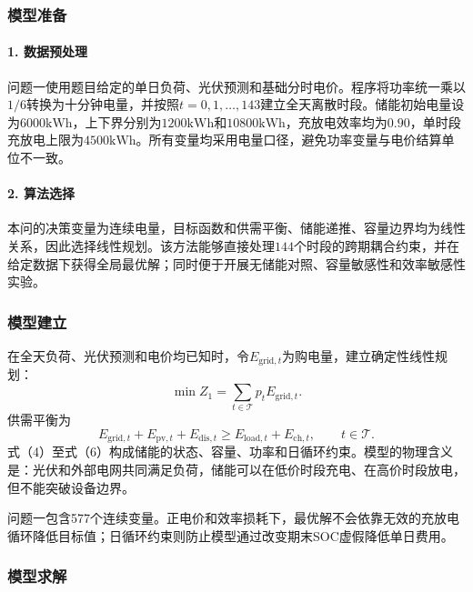 \documentclass{cumcmthesis}
\newcommand{\kwh}{\mathrm{kWh}}
\newcommand{\Tset}{\mathcal{T}}
\begin{document}
\subsubsection{模型准备}

\paragraph{1. 数据预处理}

问题一使用题目给定的单日负荷、光伏预测和基础分时电价。程序将功率统一乘以$1/6$转换为十分钟电量，并按照$ t=0,1,\ldots,143$建立全天离散时段。储能初始电量设为$6000\kwh$，上下界分别为$1200\kwh$和$10800\kwh$，充放电效率均为$0.90$，单时段充放电上限为$4500\kwh$。所有变量均采用电量口径，避免功率变量与电价结算单位不一致。

\paragraph{2. 算法选择}

本问的决策变量为连续电量，目标函数和供需平衡、储能递推、容量边界均为线性关系，因此选择线性规划。该方法能够直接处理$144$个时段的跨期耦合约束，并在给定数据下获得全局最优解；同时便于开展无储能对照、容量敏感性和效率敏感性实验。

\subsubsection{模型建立}

在全天负荷、光伏预测和电价均已知时，令$E_{\mathrm{grid},t}$为购电量，建立确定性线性规划\cite{boyd2004}：
\begin{equation}
\min Z_1=\sum_{t\in\Tset}p_tE_{\mathrm{grid},t}.
\tag{7}
\end{equation}
供需平衡为
\begin{equation}
E_{\mathrm{grid},t}+E_{\mathrm{pv},t}+E_{\mathrm{dis},t}
\geq E_{\mathrm{load},t}+E_{\mathrm{ch},t},\qquad t\in\Tset.
\tag{8}
\end{equation}
式（4）至式（6）构成储能的状态、容量、功率和日循环约束。模型的物理含义是：光伏和外部电网共同满足负荷，储能可以在低价时段充电、在高价时段放电，但不能突破设备边界。

问题一包含577个连续变量。正电价和效率损耗下，最优解不会依靠无效的充放电循环降低目标值；日循环约束则防止模型通过改变期末SOC虚假降低单日费用。

\subsubsection{模型求解}
\end{document}
